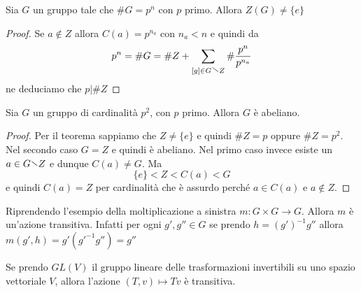 \begin{theorem}
    Sia \(G\) un gruppo tale che \(\# G = p^{n}\) con \(p\) primo. Allora
    \(Z{(G)} \neq \{e\} \) 
\end{theorem}
\begin{proof}
    Se \(a \not\in Z\) allora \(C{(a)} = p^{n_a}\) con \(n_a < n\) e quindi da
    \[
        p^{n} = \# G = \# Z + \sum_{[g] \in G\sminus Z} \# \frac{p^{n}}{p^{n_a}}
    \]
    ne deduciamo che \(p | \#Z\) 
\end{proof}
\begin{corollary}
    Sia \(G\) un gruppo di cardinalità \(p^2\), con \(p\) primo. Allora \(G\) è
    abeliano.
\end{corollary}
\begin{proof}
    Per il teorema sappiamo che \(Z \neq \{e\} \) e quindi \(\# Z = p\) oppure
    \(\# Z = p^2\). Nel secondo caso \(G = Z\) e quindi è abeliano. Nel primo
    caso invece esiste un \(a \in G \sminus Z\) e dunque \(C{(a)} \neq G\). Ma
    \[
        \{e\} < Z < C{(a)} < G
    \]
    e quindi \(C{(a)} = Z\) per cardinalità che è assurdo perché \(a \in
    C{(a)}\) e \(a \not\in Z\).
\end{proof}
\begin{example}
    Riprendendo l'esempio della moltiplicazione a sinistra \(m : G \times G \to
    G\). Allora \(m\) è un'azione transitiva. Infatti per ogni \(g', g'' \in G\) se
    prendo \(h = {(g')}^{-1} g''\) allora \(m {(g', h)} = g'{(g'^{-1} g'')} =
    g''\) 
\end{example}
\begin{example}
    Se prendo \(GL{(V)}\) il gruppo lineare delle trasformazioni invertibili su
    uno spazio vettoriale \(V\), allora l'azione \({(T, v)} \mapsto Tv\) è
    transitiva. 
\end{example}



